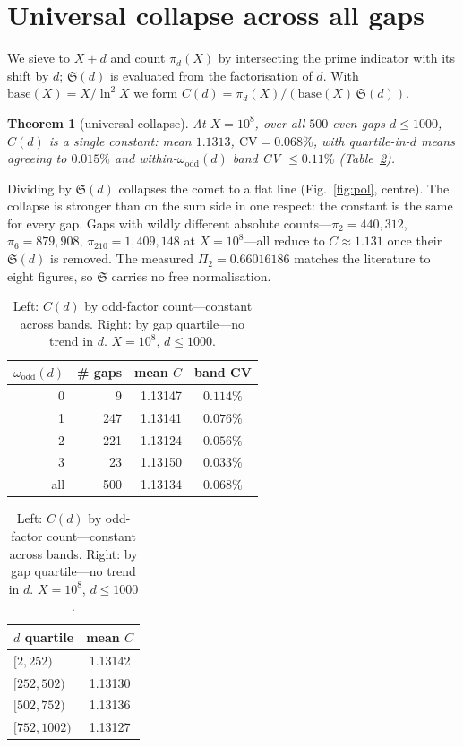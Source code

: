 \documentclass[11pt]{article}
\newtheorem{theorem}{Theorem}
\begin{document}
\section{Universal collapse across all gaps}

We sieve to $X+d$ and count $\pi_d(X)$ by intersecting the prime indicator with its
shift by $d$; $\mathfrak{S}(d)$ is evaluated from the factorisation of $d$. With
$\mathrm{base}(X)=X/\ln^2 X$ we form $C(d)=\pi_d(X)/(\mathrm{base}(X)\,\mathfrak{S}(d))$.

\begin{theorem}[universal collapse]\label{thm:pol}
At $X=10^{8}$, over all $500$ even gaps $d\le1000$, $C(d)$ is a single constant:
mean $1.1313$, $\mathrm{CV}=0.068\%$, with quartile-in-$d$ means agreeing to
$0.015\%$ and within-$\omega_{\mathrm{odd}}(d)$ band CV $\le0.11\%$
(Table~\ref{tab:pol}).
\end{theorem}

Dividing by $\mathfrak{S}(d)$ collapses the comet to a flat line
(Fig.~\ref{fig:pol}, centre). The collapse is stronger than on the sum side in one
respect: the constant is the same for every gap. Gaps with wildly different
absolute counts---$\pi_2=440{,}312$, $\pi_6=879{,}908$, $\pi_{210}=1{,}409{,}148$
at $X=10^8$---all reduce to $C\approx1.131$ once their $\mathfrak{S}(d)$ is removed.
The measured $\Pi_2=0.66016186$ matches the literature to eight figures, so
$\mathfrak{S}$ carries no free normalisation.

\begin{table}[h]\centering\small
\begin{tabular}{rrrc}
\toprule
$\omega_{\mathrm{odd}}(d)$ & \# gaps & mean $C$ & band CV\\
\midrule
0 &   9 & 1.13147 & $0.114\%$\\
1 & 247 & 1.13141 & $0.076\%$\\
2 & 221 & 1.13124 & $0.056\%$\\
3 &  23 & 1.13150 & $0.033\%$\\
\midrule
all & 500 & 1.13134 & $0.068\%$\\
\bottomrule
\end{tabular}
\qquad
\begin{tabular}{lc}
\toprule
$d$ quartile & mean $C$\\
\midrule
$[2,252)$    & 1.13142\\
$[252,502)$  & 1.13130\\
$[502,752)$  & 1.13136\\
$[752,1002)$ & 1.13127\\
\bottomrule
\end{tabular}
\caption{Left: $C(d)$ by odd-factor count---constant across bands. Right: by gap
quartile---no trend in $d$. $X=10^{8}$, $d\le1000$.}
\label{tab:pol}
\end{table}
\end{document}
